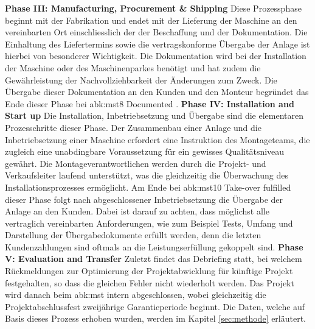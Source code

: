 \newline\newline
\textbf{Phase III: Manufacturing, Procurement \& Shipping}
\newline
Diese Prozessphase beginnt mit der Fabrikation und endet mit der Lieferung der Maschine an den vereinbarten Ort einschliesslich der der Beschaffung und der Dokumentation. Die Einhaltung des Liefertermins sowie die vertragskonforme Übergabe der Anlage ist hierbei von besonderer Wichtigkeit. Die Dokumentation wird bei der Installation der Maschine oder des Maschinenparkes benötigt und hat zudem die Gewährleistung der Nachvollziehbarkeit der Änderungen zum Zweck. Die Übergabe dieser Dokumentation an den Kunden und den Monteur begründet das Ende dieser Phase bei \gls{abk:mst}8 \glqq Documented \grqq.
\newline\newline
\textbf{Phase IV: Installation and Start up}
\newline
Die Installation, Inbetriebsetzung und Übergabe sind die elementaren Prozesschritte dieser Phase. Der Zusammenbau einer Anlage und die Inbetriebsetzung einer Maschine erfordert eine Instruktion des Montageteams, die zugleich eine unabdingbare Voraussetzung für ein gewisses Qualitätsniveau gewährt. Die Montageverantwortlichen werden durch die Projekt- und Verkaufsleiter laufend unterstützt, was die gleichzeitig die Überwachung des Installationsprozesses ermöglicht. Am Ende bei \gls{abk:mst}10 \glqq Take-over fulfilled\grqq{ } dieser Phase folgt nach abgeschlossener Inbetriebsetzung die Übergabe der Anlage an den Kunden. Dabei ist darauf zu achten, dass möglichst alle vertraglich vereinbarten Anforderungen, wie zum Beispiel Tests, Umfang und Darstellung der Übergabedokumente erfüllt werden, denn die letzten Kundenzahlungen sind oftmals an die Leistungserfüllung gekoppelt sind. 
\newline\newline
\textbf{Phase V: Evaluation and Transfer}
\newline
Zuletzt findet das Debriefing statt, bei welchem Rückmeldungen zur Optimierung der Projektabwicklung für künftige Projekt festgehalten, so dass die gleichen Fehler nicht wiederholt werden. Das Projekt wird danach beim \gls{abk:mst} intern abgeschlossen, wobei gleichzeitig die Projektabschlussfest zweijährige Garantieperiode beginnt.
\newline\newline
Die Daten, welche auf Basis dieses Prozess erhoben wurden, werden im Kapitel \ref{sec:methode} erläutert.
%
